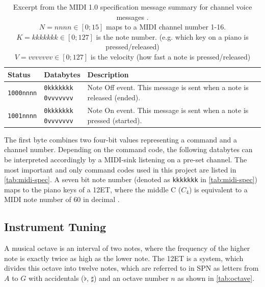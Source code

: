 \begin{table}[htbp]
	\caption{
		Excerpt from the MIDI 1.0 specification message summary for channel voice messages \cite{midi_summary_2020}.\\
		$N=nnnn \in [0;15]$ maps to a MIDI channel number 1-16. \\
		$K=kkkkkkk \in [0;127]$ is the note number. (e.g. which key on a piano is pressed/released) \\
		$V=vvvvvvv \in [0;127]$ is the velocity (how fast a note is pressed/released)
	}\label{tab:midi-spec}
	\begin{tabularx}{\textwidth}{llX}
		\toprule
		Status            & Databytes                   & Description \\ \midrule
		\texttt{1000nnnn} & \makecell{\texttt{0kkkkkkk}               \\ \texttt{0vvvvvvv}} & Note Off event. This message is sent when a note is released (ended). \\ \midrule
		\texttt{1001nnnn} & \makecell{\texttt{0kkkkkkk}               \\ \texttt{0vvvvvvv}} & Note On event. This message is sent when a note is pressed (started). \\ \bottomrule
	\end{tabularx}
\end{table}

The first byte combines two four-bit values representing a command and a channel number. Depending on the command code, the following databytes can be interpreted accordingly by a MIDI-sink listening on a pre-set channel. The most important and only command codes used in this project are listed in \autoref{tab:midi-spec}. A seven bit note number (denoted as \texttt{kkkkkkk} in \autoref{tab:midi-spec}) maps to the piano keys of a \ac{12ET}, where the middle C ($C_4$) is equivalent to a \acs{MIDI} note number of $60$ in decimal \cite[sec~2.7.1.1]{gm2_specification_online}.

\subsection{Instrument Tuning}

A musical octave is an interval of two notes, where the frequency of the higher note is exactly twice as high as the lower note. The \acs{12ET} is a system, which divides this octave into twelve notes, which are referred to in \ac{SPN} as letters from $A$ to $G$ with accidentals ($\flat$, $\sharp$) and an octave number $n$ as shown in \autoref{tab:octave}.


